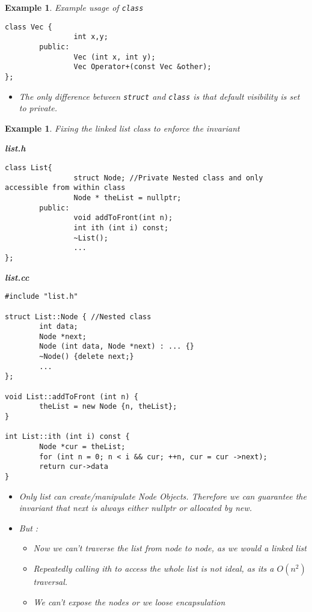 \documentclass{article}
\newtheorem{ex}[theorem]{Example}
\begin{document}
\begin{ex} Example usage of \verb|class|
\begin{lstlisting}
class Vec {
				int x,y;
		public:
				Vec (int x, int y);
				Vec Operator+(const Vec &other);
};
\end{lstlisting}
\begin{itemize}
\item The only difference between \verb|struct| and \verb|class| is that default visibility is set to private.
\end{itemize}
\end{ex}

\begin{ex} Fixing the linked list class to enforce the invariant

\textbf{list.h}
\begin{lstlisting}
class List{
				struct Node; //Private Nested class and only accessible from within class
				Node * theList = nullptr;
		public:
				void addToFront(int n);
				int ith (int i) const;
				~List();
				...
};
\end{lstlisting}

\textbf{list.cc}
\begin{lstlisting}
#include "list.h"

struct List::Node { //Nested class 
		int data;
		Node *next;
		Node (int data, Node *next) : ... {}
		~Node() {delete next;}
		...
};

void List::addToFront (int n) {
		theList = new Node {n, theList};
}

int List::ith (int i) const {
		Node *cur = theList;
		for (int n = 0; n < i && cur; ++n, cur = cur ->next);
		return cur->data
}
\end{lstlisting}
\begin{itemize}
\item Only list can create/manipulate Node Objects. Therefore we can guarantee the invariant that next is always either nullptr or allocated by new.
\item But :
\begin{itemize}
\item Now we can't traverse the list from node to node, as we would a linked list 
\item Repeatedly calling ith to access the whole list is not ideal, as its a \(O(n^2)\) traversal. 
\item We can't expose the nodes or we loose encapsulation
\end{itemize}
\end{itemize}
\end{ex}
\end{document}
